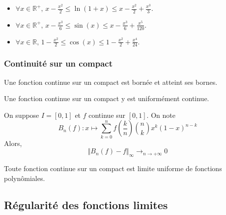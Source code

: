   \begin{application}
    \begin{itemize}
      \item $\forall x \in \mathbb{R}^+, \, x - \frac{x^2}{2} \leq \ln(1+x) \leq x - \frac{x^2}{2} + \frac{x^3}{3}$.
      \item $\forall x \in \mathbb{R}^+, \, x - \frac{x^3}{6} \leq \sin(x) \leq x - \frac{x^3}{6} + \frac{x^5}{120}$.
      \item $\forall x \in \mathbb{R}, \, 1 - \frac{x^2}{2} \leq \cos(x) \leq 1 - \frac{x^2}{2} + \frac{x^4}{24}$.
    \end{itemize}
  \end{application}

  \subsubsection{Continuité sur un compact}


  \begin{theorem}
    Une fonction continue sur un compact est bornée et atteint ses bornes.
  \end{theorem}

  \begin{theorem}[Heine]
    Une fonction continue sur un compact y est uniformément continue.
  \end{theorem}


  \begin{theorem}[Bernstein]
    On suppose $I = [0,1]$ et $f$ continue sur $[0,1]$. On note
    \[ B_n(f) : x \mapsto \sum_{k=0}^{n} f\left(\frac{k}{n}\right) \binom{n}{k} x^k (1-x)^{n-k} \]
    Alors,
    \[ \Vert B_n(f) - f \Vert_\infty \longrightarrow_{n \rightarrow +\infty} 0 \]
  \end{theorem}


  \begin{theorem}[Weierstrass]
    Toute fonction continue sur un compact est limite uniforme de fonctions polynômiales.
  \end{theorem}

  \subsection{Régularité des fonctions limites}

